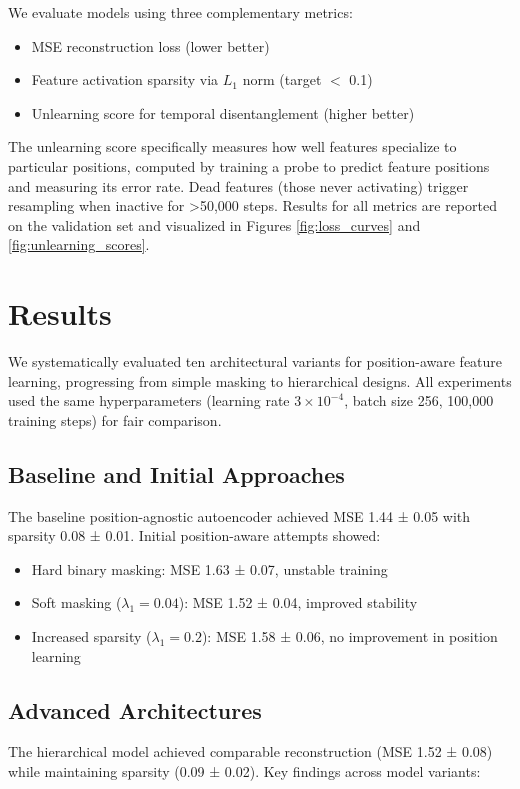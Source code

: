 \documentclass{article} %
\begin{document}
We evaluate models using three complementary metrics:
\begin{itemize}
    \item MSE reconstruction loss (lower better)
    \item Feature activation sparsity via $L_1$ norm (target $<$ 0.1)
    \item Unlearning score for temporal disentanglement (higher better)
\end{itemize}

The unlearning score specifically measures how well features specialize to particular positions, computed by training a probe to predict feature positions and measuring its error rate. Dead features (those never activating) trigger resampling when inactive for >50,000 steps. Results for all metrics are reported on the validation set and visualized in Figures \ref{fig:loss_curves} and \ref{fig:unlearning_scores}.

\section{Results}
\label{sec:results}

We systematically evaluated ten architectural variants for position-aware feature learning, progressing from simple masking to hierarchical designs. All experiments used the same hyperparameters (learning rate $3 \times 10^{-4}$, batch size 256, 100,000 training steps) for fair comparison.

\subsection{Baseline and Initial Approaches}
The baseline position-agnostic autoencoder achieved MSE 1.44 ± 0.05 with sparsity 0.08 ± 0.01. Initial position-aware attempts showed:

\begin{itemize}
    \item Hard binary masking: MSE 1.63 ± 0.07, unstable training
    \item Soft masking ($\lambda_1=0.04$): MSE 1.52 ± 0.04, improved stability
    \item Increased sparsity ($\lambda_1=0.2$): MSE 1.58 ± 0.06, no improvement in position learning
\end{itemize}

\subsection{Advanced Architectures}
The hierarchical model achieved comparable reconstruction (MSE 1.52 ± 0.08) while maintaining sparsity (0.09 ± 0.02). Key findings across model variants:
\end{document}
